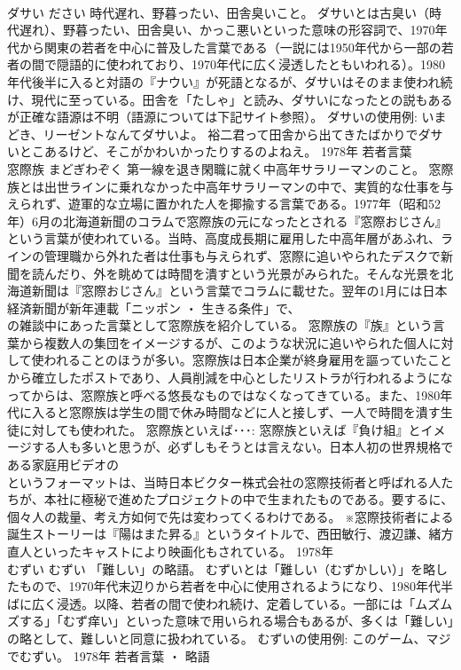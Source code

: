 \documentclass[8pt]{extreport}
\begin{document}
\begin{CJK}{UTF8}{min}
\\	ダサい	ださい	時代遅れ、野暮ったい、田舎臭いこと。	ダサいとは古臭い（時代遅れ）、野暮ったい、田舎臭い、かっこ悪いといった意味の形容詞で、1970年代から関東の若者を中心に普及した言葉である（一説には1950年代から一部の若者の間で隠語的に使われており、1970年代に広く浸透したともいわれる）。1980年代後半に入ると対語の『ナウい』が死語となるが、ダサいはそのまま使われ続け、現代に至っている。田舎を「たしゃ」と読み、ダサいになったとの説もあるが正確な語源は不明（語源については下記サイト参照）。 ダサいの使用例: いまどき、リーゼントなんてダサいよ。 裕二君って田舎から出てきたばかりでダサいとこあるけど、そこがかわいかったりするのよねえ。	1978年	若者言葉	
\\	窓際族	まどぎわぞく	第一線を退き閑職に就く中高年サラリーマンのこと。	窓際族とは出世ラインに乗れなかった中高年サラリーマンの中で、実質的な仕事を与えられず、遊軍的な立場に置かれた人を揶揄する言葉である。1977年（昭和52年）6月の北海道新聞のコラムで窓際族の元になったとされる『窓際おじさん』という言葉が使われている。当時、高度成長期に雇用した中高年層があふれ、ラインの管理職から外れた者は仕事も与えられず、窓際に追いやられたデスクで新聞を読んだり、外を眺めては時間を潰すという光景がみられた。そんな光景を北海道新聞は『窓際おじさん』という言葉でコラムに載せた。翌年の1月には日本経済新聞が新年連載「ニッポン ・ 生きる条件」で、
\\	の雑談中にあった言葉として窓際族を紹介している。 窓際族の『族』という言葉から複数人の集団をイメージするが、このような状況に追いやられた個人に対して使われることのほうが多い。窓際族は日本企業が終身雇用を謳っていたことから確立したポストであり、人員削減を中心としたリストラが行われるようになってからは、窓際族と呼べる悠長なものではなくなってきている。また、1980年代に入ると窓際族は学生の間で休み時間などに人と接しず、一人で時間を潰す生徒に対しても使われた。 窓際族といえば･･･: 窓際族といえば『負け組』とイメージする人も多いと思うが、必ずしもそうとは言えない。日本人初の世界規格である家庭用ビデオの
\\	というフォーマットは、当時日本ビクター株式会社の窓際技術者と呼ばれる人たちが、本社に極秘で進めたプロジェクトの中で生まれたものである。要するに、個々人の裁量、考え方如何で先は変わってくるわけである。 ※窓際技術者による
\\	誕生ストーリーは『陽はまた昇る』というタイトルで、西田敏行、渡辺謙、緒方直人といったキャストにより映画化もされている。	1978年	
\\	むずい	むずい	「難しい」の略語。	むずいとは「難しい（むずかしい）」を略したもので、1970年代末辺りから若者を中心に使用されるようになり、1980年代半ばに広く浸透。以降、若者の間で使われ続け、定着している。一部には「ムズムズする」「むず痒い」といった意味で用いられる場合もあるが、多くは「難しい」の略として、難しいと同意に扱われている。 むずいの使用例: このゲーム、マジでむずい。	1978年	若者言葉 ・ 略語	

\end{CJK}
\end{document}
